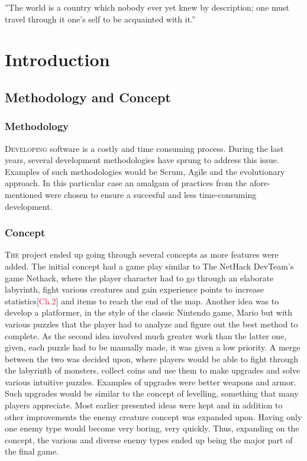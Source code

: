 \begin{savequote}[75mm] 
”The world is a country which nobody ever yet knew by description; one must travel through it one's self to be acquainted with it.”
\end{savequote}

\chapter{Introduction} %
\section{Methodology and Concept}
\subsection{Methodology}
\lettrine[lines=1]{\color{Crimson}D}{eveloping} software is a costly and time consuming process. During the last years, several development methodologies have sprung to address this issue. Examples of such methodologies would be Scrum, Agile and the evolutionary approach. In this particular case an amalgam of practices from the afore-mentioned were chosen to ensure a succesful and less time-consuming development.
\newpage
\subsection{Concept}
\lettrine[lines=1]{\color{Crimson}T}{he} project ended up going through several concepts as more features were added. The initial concept had a game play similar to The NetHack DevTeam's game Nethack\cite{Nethack}, where the player character had to go through an elaborate labyrinth, fight various creatures and gain experience points to increase statistics[\textcolor{Crimson}{Ch.2}] and items to reach the end of the map. Another idea was to develop a platformer, in the style of the classic Nintendo game, Mario but with various puzzles that the player had to analyze and figure out the best method to complete. As the second idea involved much greater work than the latter one, given, each puzzle had to be manually made, it was given a low priority. A merge between the two was decided upon, where players would be able to fight through the labyrinth of monsters, collect coins and use them to make upgrades and solve various intuitive puzzles. Examples of upgrades were better weapons and armor. Such upgrades would be similar to the concept of levelling, something that many players appreciate. Most earlier presented ideas were kept and in addition to other improvements the enemy creature concept was expanded upon. Having only one enemy type would become very boring, very quickly. Thus, expanding on the concept, the various and diverse enemy types ended up being the major part of the final game.
\afterpage{\clearpage}